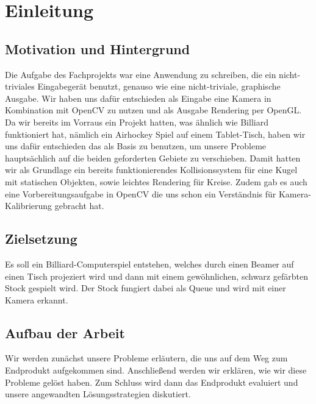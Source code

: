 
\chapter{Einleitung}

\section{Motivation und Hintergrund}
Die Aufgabe des Fachprojekts war eine Anwendung zu schreiben, die ein nicht-triviales Eingabegerät benutzt, genauso wie eine nicht-triviale, graphische Ausgabe. Wir haben uns dafür entschieden als Eingabe eine Kamera in Kombination mit OpenCV zu nutzen und als Ausgabe Rendering per OpenGL. Da wir bereits im Vorraus ein Projekt hatten, was ähnlich wie Billiard funktioniert hat, nämlich ein Airhockey Spiel auf einem Tablet-Tisch, haben wir uns dafür entschieden das als Basis zu benutzen, um unsere Probleme hauptsächlich auf die beiden geforderten Gebiete zu verschieben. Damit hatten wir als Grundlage ein bereits funktionierendes Kollisionssystem für eine Kugel mit statischen Objekten, sowie leichtes Rendering für Kreise. Zudem gab es auch eine Vorbereitungsaufgabe in OpenCV die uns schon ein Verständnis für Kamera-Kalibrierung gebracht hat. 
\section{Zielsetzung}
Es soll ein Billiard-Computerspiel entstehen, welches durch einen Beamer auf einen Tisch projeziert wird und dann mit einem gewöhnlichen, schwarz gefärbten Stock gespielt wird. Der Stock fungiert dabei als Queue und wird mit einer Kamera erkannt. 
\section{Aufbau der Arbeit}
Wir werden zunächst unsere Probleme erläutern, die uns auf dem Weg zum Endprodukt aufgekommen sind. Anschließend werden wir erklären, wie wir diese Probleme gelöst haben. Zum Schluss wird dann das Endprodukt evaluiert und unsere angewandten Lösungsstrategien diskutiert.

